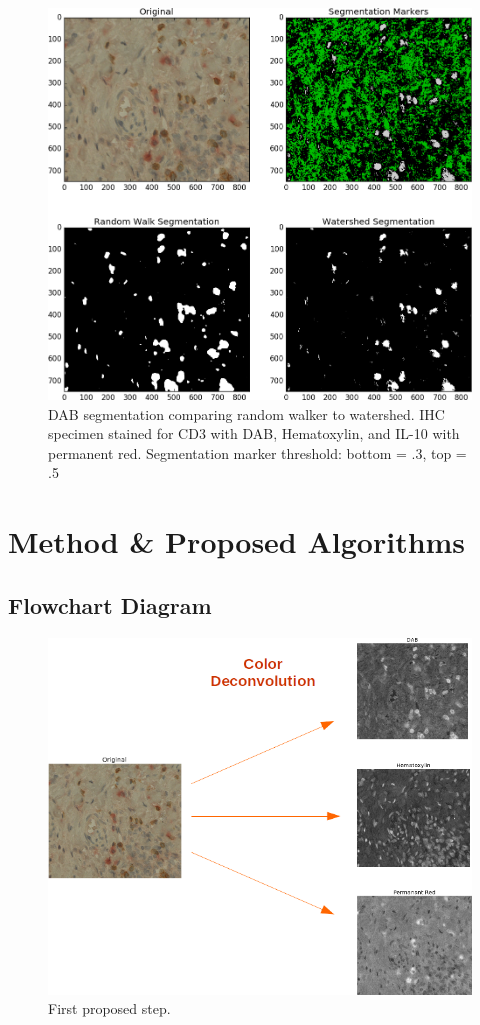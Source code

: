 \documentclass[12pt]{article}
\begin{document}
\begin{figure}[H]
  \includegraphics[width=\linewidth]{5RWSvsWatershed.png}
  \caption{DAB segmentation comparing random walker to watershed. IHC specimen stained for CD3 with DAB, Hematoxylin, and IL-10 with permanent red. Segmentation marker threshold: bottom = .3, top = .5}
  \label{fig:RWSvsWatershed5}
\end{figure}



\section*{Method \& Proposed Algorithms}
\subsection*{Flowchart Diagram}


\begin{figure}[H]
  \includegraphics[width=\linewidth]{6ColorDeconvFlow.png}
  \caption{First proposed step.}
  \label{fig:ColorDeconvFlow6}
\end{figure}
\end{document}
